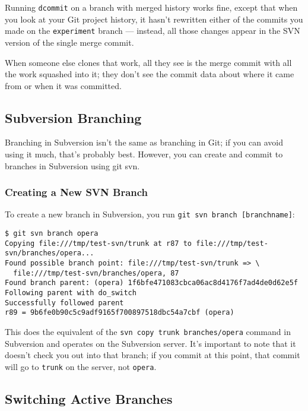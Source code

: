 \documentclass[a4paper]{book}
\begin{document}
Running \texttt{dcommit} on a branch with merged history works fine, except that when you look at your Git project history, it hasn't rewritten either of the commits you made on the \texttt{experiment} branch --- instead, all those changes appear in the SVN version of the single merge commit.

When someone else clones that work, all they see is the merge commit with all the work squashed into it; they don't see the commit data about where it came from or when it was committed.

\subsection{Subversion Branching}\label{subversion-branching}

Branching in Subversion isn't the same as branching in Git; if you can avoid using it much, that's probably best. However, you can create and commit to branches in Subversion using git svn.

\subsubsection{Creating a New SVN Branch}

To create a new branch in Subversion, you run \texttt{git svn branch {[}branchname{]}}:

\begin{shaded}\begin{verbatim}
$ git svn branch opera
Copying file:///tmp/test-svn/trunk at r87 to file:///tmp/test-svn/branches/opera...
Found possible branch point: file:///tmp/test-svn/trunk => \
  file:///tmp/test-svn/branches/opera, 87
Found branch parent: (opera) 1f6bfe471083cbca06ac8d4176f7ad4de0d62e5f
Following parent with do_switch
Successfully followed parent
r89 = 9b6fe0b90c5c9adf9165f700897518dbc54a7cbf (opera)
\end{verbatim}\end{shaded}

This does the equivalent of the \texttt{svn copy trunk branches/opera} command in Subversion and operates on the Subversion server. It's important to note that it doesn't check you out into that branch; if you commit at this point, that commit will go to \texttt{trunk} on the server, not \texttt{opera}.

\subsection{Switching Active Branches}\label{switching-active-branches}
\end{document}
